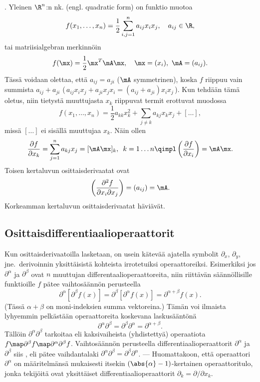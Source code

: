 \begin{Exa} . \label{neliömuoto} 
Yleinen $\R^n$:n nk.  (engl. quadratic form) on funktio muotoa
\[
f(x_1,\ldots,x_n)=\frac{1}{2}\sum_{i,j=1}^n a_{ij}x_ix_j,\quad a_{ij}\in\R,
\]
tai matriisialgebran merkinnöin
\[
f(\mx)=\frac{1}{2}\mx^T\mA\mx,\quad \mx=(x_i), \ \mA=(a_{ij}).
\]
Tässä voidaan olettaa, että $a_{ij}=a_{ji}$ ($\mA$ symmetrinen), koska $f$ riippuu vain 
summista $a_{ij}+a_{ji}$ (\,$a_{ij}x_ix_j+a_{ji}x_jx_i=(a_{ij}+a_{ji})x_ix_j$\,). Kun tehdään tämä
oletus, niin tietystä muuttujasta $x_k$ riippuvat termit erottuvat muodossa
\[
f(x_1,\ldots,x_n)=\frac{1}{2}a_{kk}x_k^2+\sum_{j\neq k} a_{kj} x_kx_j+ [\ldots],
\]
missä $[\ldots]$ ei sisällä muuttujaa $x_k$. Näin ollen
\[
\frac{\partial f}{\partial x_k}=\sum_{j=1}^n a_{kj} x_j = [\mA\mx]_k,\,\ k=1\ldots n
              \qimpl \left(\frac{\partial f}{\partial x_i}\right) = \mA\mx.
\]
Toisen kertaluvun osittaisderivaatat ovat
\[
\left(\frac{\partial^2 f}{\partial x_i\partial x_j}\right) = \left(a_{ij}\right) = \mA.
\]
Korkeamman kertaluvun osittaisderivaatat häviävät. \loppu
\end{Exa}

\subsection{Osittaisdifferentiaalioperaattorit}

Kun osittaisderivaatoilla lasketaan, on usein kätevää ajatella symbolit $\partial_x$,
$\partial_y$, jne.\ derivoinnin yksittäisistä kohteista irrotetuiksi operaattoreiksi.
Esimerkiksi jos $\partial^\alpha$ ja $\partial^\beta$ ovat $n$ muuttujan
differentaalioperaattoreita, niin riittävän säännöllisille funktioille $f$ pätee vaihtosäännön
perusteella
\[
\partial^\alpha\left[\partial^\beta f(x)\right] = \partial^\beta\left[\partial^\alpha f(x)\right]
                                                = \partial^{\alpha+\beta} f(x).
\]
(Tässä $\alpha+\beta$ on moni-indeksien summa vektoreina.) Tämän voi ilmaista lyhyemmin
pelkästään operaattoreita koskevana laskusääntönä
\[
\partial^\alpha\partial^\beta=\partial^\beta\partial^\alpha=\partial^{\alpha+\beta}.
\]
Tällöin $\partial^\alpha\partial^\beta$ tarkoitaa  eli kaksivaiheista
(yhdistettyä) operaatiota $f \map \partial^\beta f \map \partial^\alpha\partial^\beta f$.
Vaihtosäännön perusteella differentiaalioperaattorit $\partial^\alpha$ ja $\partial^\beta$ siis
, eli pätee vaihdantalaki
$\partial^\alpha\partial^\beta=\partial^\beta\partial^\alpha$. --- Huomattakoon, että operaattori
$\partial^\alpha$ on määritelmänsä mukaisesti itsekin $(\abs{\alpha}-1)$-kertainen
operaattoritulo, jonka tekijöitä ovat yksittäiset differentiaalioperaattorit 
$\partial_k=\partial/\partial x_k$.

